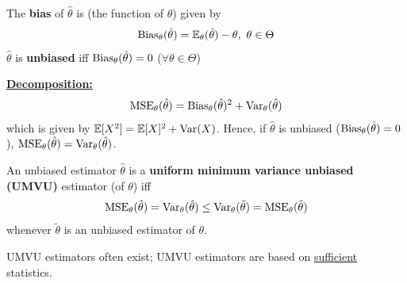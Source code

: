 \documentclass[11pt]{elegantbook}
\begin{document}
\begin{definition}[Bias]
    \normalfont
    The \textbf{bias} of $\hat{\theta}$ is (the function of $\theta$) given by
    \begin{equation}
        \begin{aligned}
            \textnormal{Bias}_\theta(\hat{\theta})=\mathbb{E}_\theta(\hat{\theta})-\theta,\ \theta\in\Theta
        \end{aligned}
        \nonumber
    \end{equation}
    $\hat{\theta}$ is \textbf{unbiased} iff $\textnormal{Bias}_\theta(\hat{\theta})=0$ ($\forall \theta\in \Theta$)
\end{definition}
\textbf{\underline{Decomposition:}}
\begin{equation}
    \begin{aligned}
        \textnormal{MSE}_\theta(\hat{\theta})=\textnormal{Bias}_\theta(\hat{\theta})^2+\textnormal{Var}_\theta(\hat{\theta})
    \end{aligned}
    \nonumber
\end{equation}
which is given by $\mathbb{E}[X^2]=\mathbb{E}[X]^2+\textnormal{Var}(X)$. Hence, if $\hat{\theta}$ is unbiased ($\textnormal{Bias}_\theta(\hat{\theta})=0$), $\textnormal{MSE}_\theta(\hat{\theta})=\textnormal{Var}_\theta(\hat{\theta})$.

\begin{definition}
    \normalfont
    An unbiased estimator $\hat{\theta}$ is a \textbf{uniform minimum variance unbiased (UMVU)} estimator (of $\theta$) iff
    \begin{equation}
        \begin{aligned}
            \textnormal{MSE}_\theta(\hat{\theta})=\textnormal{Var}_\theta(\hat{\theta})\leq \textnormal{Var}_\theta(\tilde{\theta})=\textnormal{MSE}_\theta(\tilde{\theta})
        \end{aligned}
        \nonumber
    \end{equation}
    whenever $\tilde{\theta}$ is an unbiased estimator of $\theta$.
\end{definition}
\begin{remark}
    UMVU estimators often exist; UMVU estimators are based on \underline{sufficient} statistics.
\end{remark}
\end{document}
